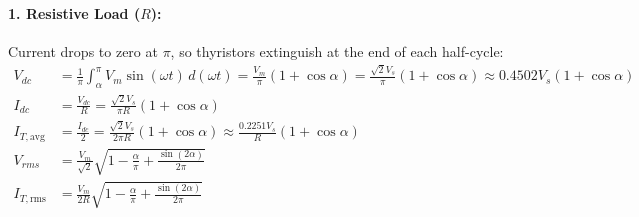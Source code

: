 \paragraph{1. Resistive Load ($R$):}
Current drops to zero at $\pi$, so thyristors extinguish at the end of each half-cycle:
\begin{align}
V_{dc} &= \frac{1}{\pi}\int_\alpha^\pi V_m \sin(\omega t)\,d(\omega t) = \frac{V_m}{\pi}(1 + \cos\alpha) = \frac{\sqrt{2} V_s}{\pi}(1 + \cos\alpha) \approx 0.4502 V_s (1 + \cos\alpha) \\
I_{dc} &= \frac{V_{dc}}{R} = \frac{\sqrt{2} V_s}{\pi R}(1 + \cos\alpha) \\
I_{T,\mathrm{avg}} &= \frac{I_{dc}}{2} = \frac{\sqrt{2} V_s}{2\pi R}(1 + \cos\alpha) \approx \frac{0.2251 V_s}{R}(1 + \cos\alpha) \\
V_{rms} &= \frac{V_m}{\sqrt{2}}\sqrt{1 - \frac{\alpha}{\pi} + \frac{\sin(2\alpha)}{2\pi}} \\
I_{T,\mathrm{rms}} &= \frac{V_m}{2R}\sqrt{1 - \frac{\alpha}{\pi} + \frac{\sin(2\alpha)}{2\pi}}
\end{align}

